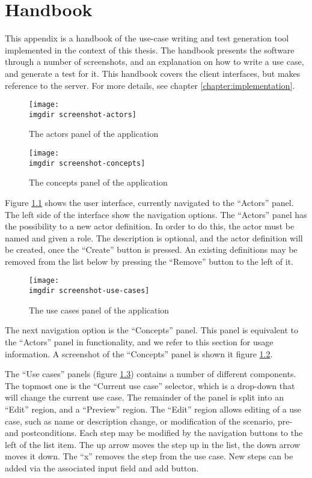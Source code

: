 \chapter{Handbook}
\label{appendix:handbook}
This appendix is a handbook of the use-case writing and test generation tool implemented in the context of this thesis. The handbook presents the software through a number of screenshots, and an explanation on how to write a use case, and generate a test for it. This handbook covers the client interfaces, but makes reference to the server. For more details, see chapter \ref{chapter:implementation}.\medskip

\begin{figure}[!htbp]
  \centering
  \texttt{[image: \\imgdir screenshot-actors]}
  \caption{The actors panel of the application}
\label{fig:screenshot-actors}
\end{figure}

\begin{figure}[!htbp]
  \centering
  \texttt{[image: \\imgdir screenshot-concepts]}
  \caption{The concepts panel of the application}
\label{fig:screenshot-concepts}
\end{figure}

\noindent Figure \ref{fig:screenshot-actors} shows the user interface, currently navigated to the ``Actors'' panel. The left side of the interface show the navigation options. The ``Actors'' panel has the possibility to a new actor definition. In order to do this, the actor must be named and given a role. The description is optional, and the actor definition will be created, once the ``Create'' button is pressed. An existing definitions may be removed from the list below by pressing the ``Remove'' button to the left of it. \medskip

\begin{figure}[!htbp]
  \centering
  \texttt{[image: \\imgdir screenshot-use-cases]}
  \caption{The use cases panel of the application}
\label{fig:screenshot-use-cases}
\end{figure}

\noindent The next navigation option is the ``Concepts'' panel. This panel is equivalent to the ``Actors'' panel in functionality, and we refer to this section for usage information. A screenshot of the ``Concepts'' panel is shown it figure \ref{fig:screenshot-concepts}.\medskip

\noindent The ``Use cases'' panels (figure \ref{fig:screenshot-use-cases}) contains a number of different components. The topmost one is the ``Current use case'' selector, which is a drop-down that will change the current use case. The remainder of the panel is split into an ``Edit'' region, and a ``Preview'' region. The ``Edit'' region allows editing of a use case, such as name or description change, or modification of the scenario, pre- and postconditions. Each step may be modified by the navigation buttons to the left of the list item. The up arrow moves the step up in the list, the down arrow moves it down. The ``x'' removes the step from the use case. New steps can be added via the associated input field and add button. \medskip 

